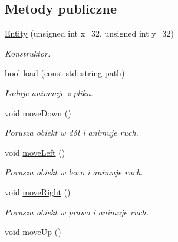 \subsection*{Metody publiczne}
\begin{DoxyCompactItemize}
\item 
\hyperlink{class_entity_a8e13fe1a39745c6912d62e252edc0709}{Entity} (unsigned int x=32, unsigned int y=32)
\begin{DoxyCompactList}\small\item\em Konstruktor. \end{DoxyCompactList}\item 
bool \hyperlink{class_entity_a2d6182aff5fb37582bdb52abfd1d7fde}{load} (const std\-::string path)
\begin{DoxyCompactList}\small\item\em Ładuje animacje z pliku. \end{DoxyCompactList}\item 
\hypertarget{class_entity_a10f39c35a26c9a808676c70eb2742c7b}{void \hyperlink{class_entity_a10f39c35a26c9a808676c70eb2742c7b}{move\-Down} ()}\label{class_entity_a10f39c35a26c9a808676c70eb2742c7b}

\begin{DoxyCompactList}\small\item\em Porusza obiekt w dół i animuje ruch. \end{DoxyCompactList}\item 
\hypertarget{class_entity_a7775cd62029bcba5875a6d9e28172d0e}{void \hyperlink{class_entity_a7775cd62029bcba5875a6d9e28172d0e}{move\-Left} ()}\label{class_entity_a7775cd62029bcba5875a6d9e28172d0e}

\begin{DoxyCompactList}\small\item\em Porusza obiekt w lewo i animuje ruch. \end{DoxyCompactList}\item 
\hypertarget{class_entity_a72d22f873f82e23e424f58d42a45162c}{void \hyperlink{class_entity_a72d22f873f82e23e424f58d42a45162c}{move\-Right} ()}\label{class_entity_a72d22f873f82e23e424f58d42a45162c}

\begin{DoxyCompactList}\small\item\em Porusza obiekt w prawo i animuje ruch. \end{DoxyCompactList}\item 
\hypertarget{class_entity_ab72296eceda3417186ccdb2b2dd64ff8}{void \hyperlink{class_entity_ab72296eceda3417186ccdb2b2dd64ff8}{move\-Up} ()}\label{class_entity_ab72296eceda3417186ccdb2b2dd64ff8}


\end{DoxyCompactItemize}
